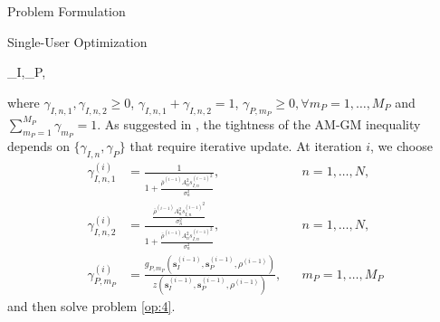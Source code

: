 \documentclass{IEEEtran}
\begin{document}
\begin{section}{Problem Formulation}
\begin{subsection}{Single-User Optimization}
		\begin{mini}
			{\boldsymbol{s}_I,_P,\rho}{}{\label{op:4}}{}
		\end{mini}
		where $\gamma_{I,n,1},\gamma_{I,n,2} \ge 0$, $\gamma_{I,n,1}+\gamma_{I,n,2}=1$, $\gamma_{P,m_P} \ge 0,\forall m_P=1,\dots,M_P$ and $\sum_{{m_P}=1}^{M_P}{\gamma_{m_P}}=1$. As suggested in \cite{Clerckx2018b}, the tightness of the AM-GM inequality depends on $\{\gamma_{I,n},\gamma_P\}$ that require iterative update. At iteration $i$, we choose
		\begin{align}
			\gamma_{I,n,1}^{(i)} & =\frac{1}{1+\frac{\bar{\rho}^{(i-1)}{A_n^2}{s_{I,n}^{(i-1)}}^2}{\sigma_n^2}},                                                                         &  & n=1,\dots,N,    \\
			\gamma_{I,n,2}^{(i)} & =\frac{\frac{\bar{\rho}^{(i-1)}{A_n^2}{s_{I,n}^{(i-1)}}^2}{\sigma_n^2}}{1+\frac{\bar{\rho}^{(i-1)}{A_n^2}{s_{I,n}^{(i-1)}}^2}{\sigma_n^2}},           &  & n=1,\dots,N,    \\
			\gamma_{P,m_P}^{(i)} & =\frac{g_{P,m_P}(\boldsymbol{s}_I^{(i-1)},\boldsymbol{s}_P^{(i-1)},\rho^{(i-1)})}{z(\boldsymbol{s}_I^{(i-1)},\boldsymbol{s}_P^{(i-1)},\rho^{(i-1)})}, &  & m_P=1,\dots,M_P
		\end{align}
		and then solve problem \ref{op:4}.
	\end{subsection}
\end{section}



\end{document}
